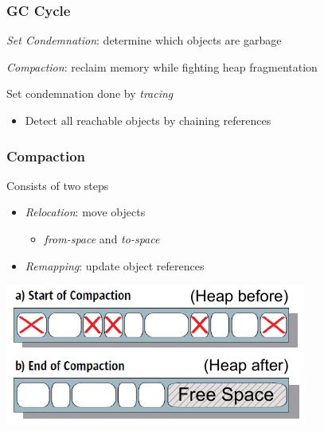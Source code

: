 \documentclass{beamer}
\newcommand{\linespace}{\vskip 0.25cm}
\begin{document}
\begin{frame}

\frametitle{GC Cycle}

\emph{Set Condemnation}: determine which objects are garbage 

\linespace
\linespace

\emph{Compaction}: reclaim memory while fighting heap fragmentation

\linespace
\linespace
\linespace

Set condemnation done by \emph{tracing}
\begin{itemize}
\item Detect all reachable objects by chaining references
\end{itemize}

\end{frame}

\begin{frame}

\frametitle{Compaction}


Consists of two steps
\begin{itemize}
\item \emph{Relocation}: move objects 
\begin{itemize}
\item \emph{from-space} and \emph{to-space}
\end{itemize}
\item \emph{Remapping}: update object references
\end{itemize}

\linespace

\begin{center}
\includegraphics[width=.60\textwidth]{Illustrations/bg_compaction.pdf}
\end{center}


\end{frame}
\end{document}

